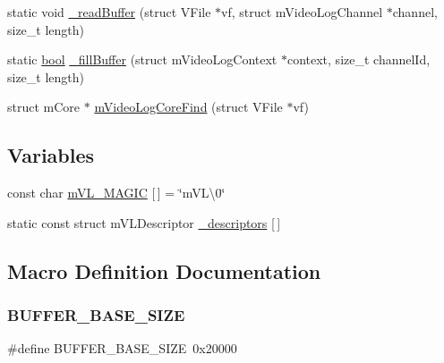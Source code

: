 \begin{DoxyCompactItemize}
\item 
static void \mbox{\hyperlink{video-logger_8c_a4b7dfbbd89bf3e590e5c16912b79bfa4}{\+\_\+read\+Buffer}} (struct V\+File $\ast$vf, struct m\+Video\+Log\+Channel $\ast$channel, size\+\_\+t length)
\item 
static \mbox{\hyperlink{libretro_8h_a4a26dcae73fb7e1528214a068aca317e}{bool}} \mbox{\hyperlink{video-logger_8c_ac918b379da982809457516728ac365c0}{\+\_\+fill\+Buffer}} (struct m\+Video\+Log\+Context $\ast$context, size\+\_\+t channel\+Id, size\+\_\+t length)
\item 
struct m\+Core $\ast$ \mbox{\hyperlink{video-logger_8c_a16da7b6caa981b54250b3a0eb1c945a2}{m\+Video\+Log\+Core\+Find}} (struct V\+File $\ast$vf)
\end{DoxyCompactItemize}
\subsection*{Variables}
\begin{DoxyCompactItemize}
\item 
const char \mbox{\hyperlink{video-logger_8c_a5d1620a649e7d23e38b4a81320d2e690}{m\+V\+L\+\_\+\+M\+A\+G\+IC}} \mbox{[}$\,$\mbox{]} = \char`\"{}m\+V\+L\textbackslash{}0\char`\"{}
\item 
static const struct m\+V\+L\+Descriptor \mbox{\hyperlink{video-logger_8c_a787ded6be63576e12586e834b8a96b6b}{\+\_\+descriptors}} \mbox{[}$\,$\mbox{]}
\end{DoxyCompactItemize}


\subsection{Macro Definition Documentation}
\mbox{\label{video-logger_8c_a0ac864c0038cca0b382e3103f9a6f32e}} 
\subsubsection{\texorpdfstring{B\+U\+F\+F\+E\+R\+\_\+\+B\+A\+S\+E\+\_\+\+S\+I\+ZE}{BUFFER\_BASE\_SIZE}}
{\footnotesize\ttfamily \#define B\+U\+F\+F\+E\+R\+\_\+\+B\+A\+S\+E\+\_\+\+S\+I\+ZE~0x20000}

